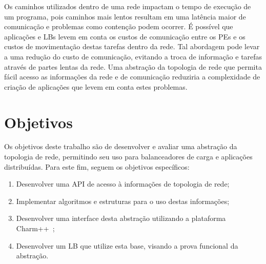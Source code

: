 \documentclass[
	12pt,				%
	openright,			%
	twoside,			%
	a4paper,			%
	english,			%
	brazil,				%
	]{abntex2}
\begin{document}
Os caminhos utilizados dentro de uma rede impactam o tempo de execução de um programa, pois caminhos mais lentos resultam em uma latência maior de comunicação e problemas como contenção podem ocorrer. É possível que aplicações e LBs levem em conta os custos de comunicação entre os PEs e os custos de movimentação destas tarefas dentro da rede. Tal abordagem pode levar a uma redução do custo de comunicação, evitando a troca de informação e tarefas através de partes lentas da rede. Uma abstração da topologia de rede que permita fácil acesso as informações da rede e de comunicação reduziria a complexidade de criação de aplicações que levem em conta estes problemas.

\section{Objetivos}
\label{sec:objetivos}

Os objetivos deste trabalho são de desenvolver e avaliar uma abstração da topologia de rede, permitindo seu uso para balanceadores de carga e aplicações distribuídas. Para este fim, seguem os objetivos específicos:

\begin{enumerate}
\item Desenvolver uma API de acesso à informações de topologia de rede;
\item Implementar algoritmos e estruturas para o uso destas informações;
\item Desenvolver uma interface desta abstração utilizando a plataforma Charm++~\cite{website:CHARM};
\item Desenvolver um LB que utilize esta base, visando a prova funcional da abstração.

\end{enumerate}
\end{document}
